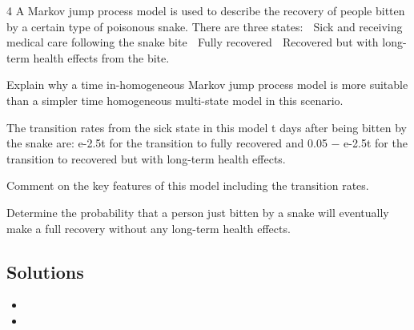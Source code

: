 
4 A Markov jump process model is used to describe the recovery of people bitten by a
certain type of poisonous snake. There are three states:
 Sick and receiving medical care following the snake bite
 Fully recovered
 Recovered but with long-term health effects from the bite.
\item   Explain why a time in-homogeneous Markov jump process model is more
suitable than a simpler time homogeneous multi-state model in this scenario.

The transition rates from the sick state in this model t days after being bitten by the
snake are:
e-2.5t for the transition to fully recovered and
0.05 − e-2.5t for the transition to recovered but with long-term health effects.
\item   Comment on the key features of this model including the transition rates. 
\item  Determine the probability that a person just bitten by a snake will eventually
make a full recovery without any long-term health effects. 

\subsection*{Solutions}

\begin{itemize}
\item
\item
\end{itemize}



